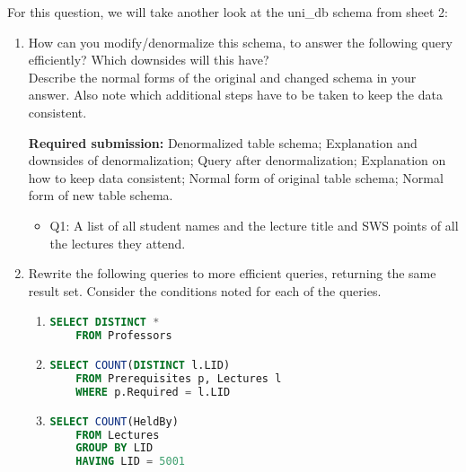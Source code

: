 


\newcommand{\subtitle}{\textbf{Exercise 6}}
\newcommand{\outdate}{27.11.2023}
\newcommand{\duedate}{04.12.2023 12:00 MEZ}
\newcommand{\video}{033}





  For this question, we will take another look at the uni\_db schema from sheet 2:

\begin{enumerate}
\item

  How can you modify/denormalize this schema, to answer the following query efficiently?
  Which downsides will this have?\\
  Describe the normal forms of the original and changed schema in your answer. 
  Also note which additional steps have to be taken to keep the data consistent.

  \textbf{Required submission:} Denormalized table schema; Explanation and downsides of denormalization; Query after denormalization; Explanation on how to keep data consistent; Normal form of original table schema; Normal form of new table schema.

  \begin{itemize}
    \item Q1: A list of all student names and the lecture title and SWS points of all the lectures they attend.
  \end{itemize}

\item
  Rewrite the following queries to more efficient queries, returning the same result set.
  Consider the conditions noted for each of the queries.

  \begin{enumerate}
  \item

    \begin{lstlisting}[language=sql]
    SELECT DISTINCT *
    FROM Professors
    \end{lstlisting}

  \item
    \begin{lstlisting}[language=sql]
    SELECT COUNT(DISTINCT l.LID)
    FROM Prerequisites p, Lectures l
    WHERE p.Required = l.LID
    \end{lstlisting}

  \item
    \begin{lstlisting}[language=sql]
    SELECT COUNT(HeldBy)
    FROM Lectures
    GROUP BY LID
    HAVING LID = 5001
    \end{lstlisting}


\end{enumerate}
\end{enumerate}
